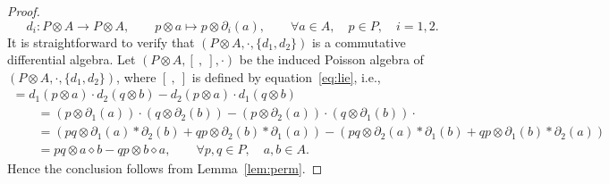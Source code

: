 \documentclass[pdftex]{sigma}
\numberwithin{equation}{section}
\begin{document}
\begin{proof}
 \begin{equation*}
 	d_i: P \otimes A \to P \otimes A, \qquad p \otimes a \mapsto p \otimes \partial_i(a), \qquad \forall a \in A, \quad p \in P, \quad i=1,2.
 \end{equation*}
 It is straightforward to verify that $(P \otimes A, \cdot, \{d_1, d_2\})$ is a commutative differential algebra.
 Let $(P \otimes A, [\ ,\ ], \cdot)$ be the induced Poisson algebra of
 $(P \otimes A, \cdot, \{d_1, d_2\})$, where $[\ ,\ ]$ is defined by equation~\eqref{eq:lie}, i.e.,
 \begin{gather*}
 	[p \otimes a, q \otimes b] = d_1(p \otimes a) \cdot d_2(q \otimes b) - d_2(p \otimes a) \cdot d_1(q \otimes b) \\
 \qquad{}= (p \otimes \partial_1(a)) \cdot (q \otimes \partial_2(b)) - (p \otimes \partial_2(a) ) \cdot (q \otimes \partial_1(b)) \cdot\\
 \qquad{}= (pq \otimes \partial_1(a) \ast \partial_2(b) + qp \otimes \partial_2(b) \ast \partial_1(a)) - ( pq \otimes \partial_2(a) \ast \partial_1(b) + qp \otimes \partial_1(b) \ast \partial_2(a))\\
\qquad{} = pq \otimes a \diamond b-qp \otimes b \diamond a, \qquad \forall p,q \in P, \quad a, b \in A.
	\end{gather*}
	Hence the conclusion follows from Lemma~\ref{lem:perm}.
\end{proof}
\end{document}
